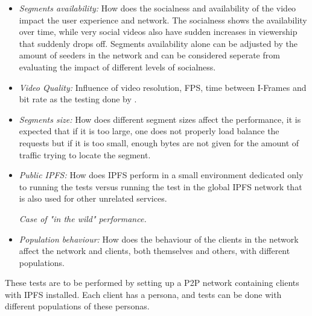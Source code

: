 \begin{itemize}
   \item \textit{Segments availability:}
    How does the socialness and availability of the video impact the user experience and network. The socialness shows the availability over time, while very social videos also have sudden increases in viewership that suddenly drops off. Segments availability alone can be adjusted by the amount of seeders in the network and can be considered seperate from evaluating the impact of different levels of socialness.
    
    \item \textit{Video Quality:}
    Influence of video resolution, \ac{FPS}, time between I-Frames and bit rate as the testing done by \citeauthor{aloman2015performance}.
    
    \item \textit{Segments size:}
    How does different segment sizes affect the performance, it is expected that if it is too large, one does not properly load balance the requests but if it is too small, enough bytes are not given for the amount of traffic trying to locate the segment.
    \item \textit{Public IPFS:}
    How does \ac{IPFS} perform in a small environment dedicated only to running the tests versus running the test in the global \ac{IPFS} network that is also used for other unrelated services.
    
    \textit{Case of "in the wild" performance.} 
    \item \textit{Population behaviour:}
    How does the behaviour of the clients in the network affect the network and clients, both themselves and others, with different populations.
\end{itemize}

These tests are to be performed by setting up a \ac{P2P} network containing clients with \ac{IPFS} installed. Each client has a persona, and tests can be done with different populations of these personas.

